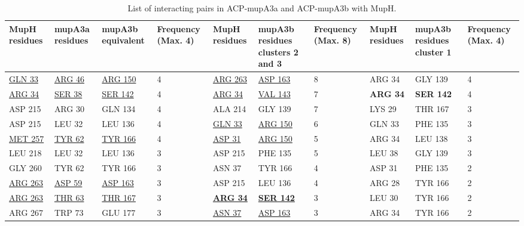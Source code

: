 			\begin{table}
			\begin{small}
			\caption{List of interacting pairs in ACP-mupA3a and ACP-mupA3b with MupH.}
			\label{tab: interacting_pairs}
			\begin{center}
			\begin{threeparttable}[b]
			\begin{tabular}{l l l l l l l l l l}
			\toprule[2pt]
			\multicolumn{ 1}{p{1cm}}{MupH residues} & \multicolumn{ 1}{p{1cm}}{mupA3a residues} & \multicolumn{1}{p{2cm}}{mupA3b equivalent} & \multicolumn{1}{p{2cm}}{Frequency (Max. 4)} & \multicolumn{ 1}{p{1cm}}{MupH residues} & \multicolumn{ 1}{p{3cm}}{mupA3b residues clusters 2 and 3} & \multicolumn{1}{p{2cm}}{Frequency (Max. 8)} & \multicolumn{1}{p{1cm}}{MupH residues} & \multicolumn{1}{p{3cm}}{mupA3b residues cluster 1} & \multicolumn{1}{p{2cm}}{Frequency (Max. 4)} \\ 
			\midrule[1pt]
			\underline{GLN 33} & \underline{ARG 46} & \underline{ARG 150} & 4 & \underline{ARG 263} & \underline{ASP 163} & 8 & ARG 34 & GLY 139 & 4 \\ 
			\underline{ARG 34} & \underline{SER 38} & \underline{SER 142} & 4 & \underline{ARG 34} & \underline{VAL 143} & 7 & \textbf{ARG 34} & \textbf{SER 142} & 4 \\ 
			ASP 215 & ARG 30 & GLN 134 & 4 & ALA 214 & GLY 139 & 7 & LYS 29 & THR 167 & 3 \\ 
			ASP 215 & LEU 32 & LEU 136 & 4 & \underline{GLN 33} & \underline{ARG 150} & 6 & GLN 33 & PHE 135 & 3 \\ 
			\underline{MET 257} & \underline{TYR 62} & \underline{TYR 166} & 4 & \underline{ASP 31} & \underline{ARG 150} & 5 & ARG 34 & LEU 138 & 3 \\ 
			LEU 218 & LEU 32 & LEU 136 & 3 & ASP 215 & PHE 135 & 5 & LEU 38 & GLY 139 & 3 \\ 
			GLY 260 & TYR 62 & TYR 166 & 3 & ASN 37 & TYR 166 & 4 & ASP 31 & PHE 135 & 2 \\ 
			\underline{ARG 263} & \underline{ASP 59} & \underline{ASP 163} & 3 & ASP 215 & LEU 136 & 4 & ARG 28 & TYR 166 & 2 \\ 
			\underline{ARG 263} & \underline{THR 63} & \underline{THR 167} & 3 & \underline{\textbf{ARG 34}} & \underline{\textbf{SER 142}} & 3 & LEU 30 & TYR 166 & 2 \\ 
			ARG 267 & TRP 73 & GLU 177 & 3 & \underline{ASN 37} & \underline{ASP 163} & 3 & ARG 34 & TYR 166 & 2 \\ 

\end{tabular}
\end{threeparttable}
\end{center}
\end{small}
\end{table}
